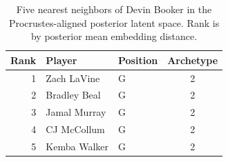 \begin{table}[htbp]
  \centering\small
  \begin{tabular}{rllc}
    \toprule
    Rank & Player & Position & Archetype \\
    \midrule
    1 & Zach LaVine & G & 2 \\
    2 & Bradley Beal & G & 2 \\
    3 & Jamal Murray & G & 2 \\
    4 & CJ McCollum & G & 2 \\
    5 & Kemba Walker & G & 2 \\
    \bottomrule
  \end{tabular}
  \caption{Five nearest neighbors of Devin Booker in the Procrustes-aligned posterior latent space. Rank is by posterior mean embedding distance.}
\end{table}

